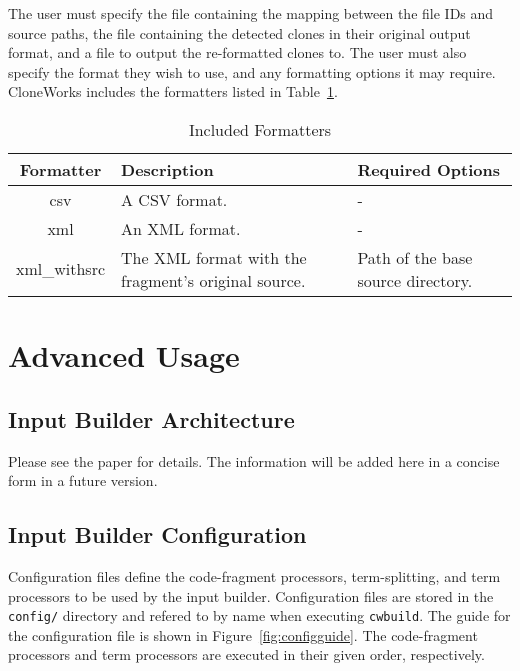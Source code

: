 \documentclass[]{article}
\begin{document}
	The user must specify the file containing the mapping between the file IDs and source paths, the file containing the detected clones in their original output format, and a file to output the re-formatted clones to.  The user must also specify the format they wish to use, and any formatting options it may require.  CloneWorks includes the formatters listed in Table~\ref{tab:formatters}.\\
	
	\begin{table}
	\begin{tabular}{cll}
		\toprule
		Formatter & Description & Required Options \\
		\midrule
		csv & A CSV format. & - \\
		xml & An XML format. & - \\
		xml\_withsrc & The XML format with the fragment's original source. & Path of the base source directory. \\
		\bottomrule
	\end{tabular}
	\caption{Included Formatters}\label{tab:formatters}
	\end{table}

\section{Advanced Usage} \label{sec:advusage}

	\subsection{Input Builder Architecture}
	Please see the paper for details.  The information will be added here in a concise form in a future version.
	
	\subsection{Input Builder Configuration}
	Configuration files define the code-fragment processors, term-splitting, and term processors to be used by the input builder.  Configuration files are stored in the \verb|config/| directory and refered to by name when executing \verb|cwbuild|.  The guide for the configuration file is shown in Figure~\ref{fig:configguide}.  The code-fragment processors and term processors are executed in their given order, respectively.
	
\end{document}

